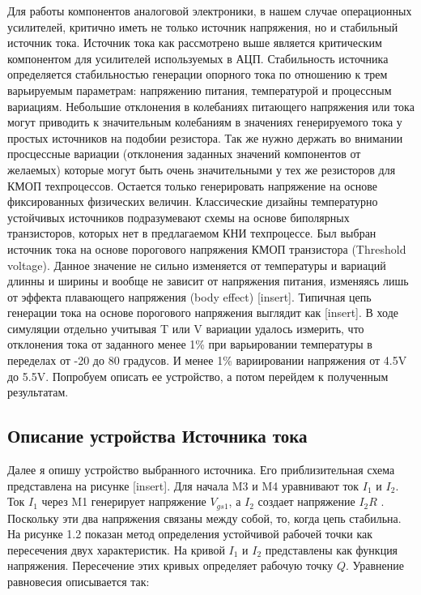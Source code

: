\documentclass[a4paper,12pt]{article} %
\begin{document}
Для работы компонентов аналоговой электроники, в нашем случае операционных усилителей, критично иметь не только источник напряжения, но и стабильный источник тока. Источник тока как рассмотрено выше является критическим компонентом для усилителей используемых в АЦП. Стабильность источника определяется стабильностью генерации опорного тока по отношению к трем варьируемым параметрам: напряжению питания, температурой и процессным вариациям\cite{op_amp_comp10}. Небольшие отклонения в колебаниях питающего напряжения или тока могут приводить к значительным колебаниям в значениях генерируемого тока у простых источников на подобии резистора.  Так же нужно держать во внимании просцессные вариации (отклонения заданных  значений компонентов от желаемых) которые могут быть очень значительными у тех же резисторов для КМОП техпроцессов. Остается только генерировать напряжение на основе фиксированных физических величин. Классические дизайны температурно устойчивых источников подразумевают схемы на основе биполярных транзисторов, которых нет в предлагаемом КНИ техпроцессе. Был выбран источник тока на основе порогового напряжения КМОП транзистора (Threshold voltage)\cite{op_amp_comp11}. Данное значение не сильно изменяется от температуры и вариаций длинны и ширины и вообще не зависит от напряжения питания, изменяясь лишь от эффекта плавающего напряжения (body effect) [insert]. Типичная цепь генерации тока на основе порогового напряжения выглядит как [insert]. В ходе симуляции отдельно учитывая T или V вариации удалось измерить, что отклонения тока от заданного менее 1\% при варьировании температуры в переделах от -20 до 80 градусов. И менее 1\% вариировании напряжения от 4.5V до 5.5V. Попробуем описать ее устройство, а потом перейдем к полученным результатам.


\subsection{Описание устройства Источника тока }


Далее я опишу устройство выбранного источника. Его приблизительная схема представлена на рисунке [insert].
Для начала M3 и M4 уравнивают ток $ I_1 $ и $ I_2 $. Ток $I_1$ через M1 генерирует напряжение $V_{gs1}$, а $I_2$ создает напряжение $I_2 R $ . Поскольку эти два напряжения связаны между собой, то, когда цепь стабильна\cite{op_amp_comp12}. На рисунке 1.2 показан метод определения устойчивой рабочей  точки как пересечения двух характеристик. 
 На кривой $ I_1 $ и $ I_2 $ представлены как функция напряжения. Пересечение этих кривых определяет рабочую точку $Q$. Уравнение равновесия описывается так: 
\end{document}
